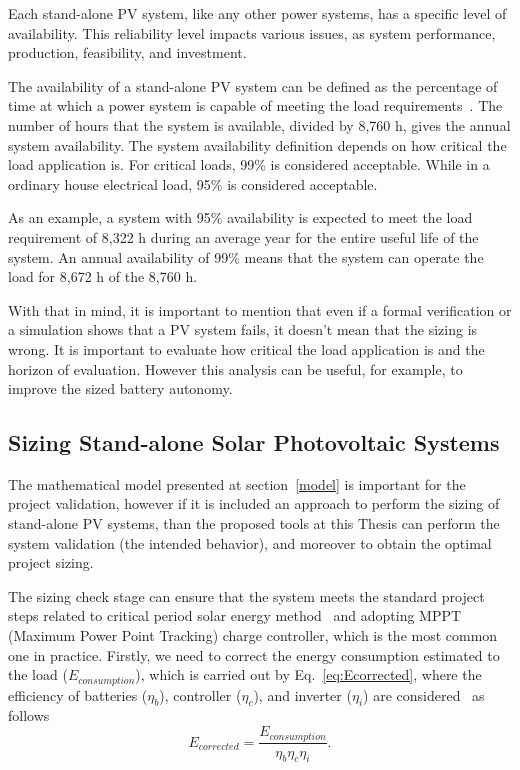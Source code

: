 Each stand-alone PV system, like any other power systems, has a specific level of availability. This reliability level impacts various issues, as system performance, production, feasibility, and investment. 

The availability of a stand-alone PV system can be defined as the percentage of time at which a power system is capable of meeting the load requirements~\cite{Khatib2014}. The number of hours that the system is available, divided by 8,760 h, gives the annual system availability.
The system availability definition depends on how critical the load application is. For critical loads, 99\% is considered acceptable. While in a ordinary house electrical load, 95\% is considered acceptable. 

As an example, a system with 95\% availability is expected to meet the load requirement of 8,322 h during an average year for the entire useful life of the system. An annual availability of 99\% means that the system can operate the load for 8,672 h of the 8,760 h.

With that in mind, it is important to mention that even if a formal verification or a simulation shows that a PV system fails, it doesn't mean that the sizing is wrong. It is important to evaluate how critical the load application is and the horizon of evaluation. However this analysis can be useful, for example, to improve the sized battery autonomy.

\subsection{Sizing Stand-alone Solar Photovoltaic Systems}

The mathematical model presented at section~\ref{model} is important for the project validation, however if it is included an approach to perform the sizing of stand-alone PV systems, than the proposed tools at this Thesis can perform the system validation (the intended behavior), and moreover to obtain the optimal project sizing.

The sizing check stage can ensure that the system meets the standard project steps related 
to critical period solar energy method~\cite{Pinho} and adopting MPPT (Maximum Power Point Tracking) charge controller,
which is the most common one in practice. Firstly, we need to correct the energy consumption estimated to the load 
($E_{consumption}$), which is carried out by Eq.~\eqref{eq:Ecorrected}, where the efficiency of batteries ($\eta_{b}$), 
controller ($\eta_{c}$), and inverter ($\eta_{i}$) are considered~\cite{Pinho} as follows
%
\begin{equation}
\label{eq:Ecorrected}
E_{corrected} = \dfrac{E_{consumption}}{\eta_{b} \eta_{c} \eta_{i} }.
\end{equation}

